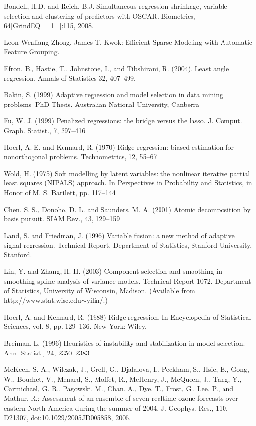\documentclass{article} %
\begin{document}
\noindent [8] Bondell, H.D. and Reich, B.J. Simultaneous regression shrinkage, variable selection and clustering of predictors with OSCAR. Biometrics, 64\eqref{GrindEQ__1_}:115, 2008. \textbf{}

\noindent [9] Leon Wenliang Zhong, James T. Kwok: Efficient Sparse Modeling with Automatic Feature Grouping.

\noindent [10] Efron, B., Hastie, T., Johnstone, I., and Tibshirani, R. (2004). Least angle regression. Annals of Statistics 32, 407--499.\textbf{}

\noindent [11] Bakin, S. (1999) Adaptive regression and model selection in data mining problems. PhD Thesis. Australian National University, Canberra

\noindent [12] Fu, W. J. (1999) Penalized regressions: the bridge versus the lasso. J. Comput. Graph. Statist., 7, 397--416

\noindent [13] Hoerl, A. E. and Kennard, R. (1970) Ridge regression: biased estimation for nonorthogonal problems. Technometrics, 12, 55--67

\noindent [14] Wold, H. (1975) Soft modelling by latent variables: the nonlinear iterative partial least squares (NIPALS) approach. In Perspectives in Probability and Statistics, in Honor of M. S. Bartlett, pp. 117--144

\noindent [15] Chen, S. S., Donoho, D. L. and Saunders, M. A. (2001) Atomic decomposition by basis pursuit. SIAM Rev., 43, 129--159

\noindent [16] Land, S. and Friedman, J. (1996) Variable fusion: a new method of adaptive signal regression. Technical Report. Department of Statistics, Stanford University, Stanford.

\noindent [17] Lin, Y. and Zhang, H. H. (2003) Component selection and smoothing in smoothing spline analysis of variance models. Technical Report 1072. Department of Statistics, University of Wisconsin, Madison. (Available from http://www.stat.wisc.edu$\mathrm{\sim }$yilin/.)

\noindent [18] Hoerl, A. and Kennard, R. (1988) Ridge regression. In Encyclopedia of Statistical Sciences, vol. 8, pp. 129--136. New York: Wiley.

\noindent [19] Breiman, L. (1996) Heuristics of instability and stabilization in model selection. Ann. Statist., 24, 2350--2383.

\noindent [20] McKeen, S. A., Wilczak, J., Grell, G., Djalalova, I., Peckham, S., Hsie, E., Gong, W., Bouchet, V., Menard, S., Moffet, R., McHenry, J., McQueen, J., Tang, Y., Carmichael, G. R., Pagowski, M., Chan, A., Dye, T., Frost, G., Lee, P., and Mathur, R.: Assessment of an ensemble of seven realtime ozone forecasts over eastern North America during the summer of 2004, J. Geophys. Res., 110, D21307, doi:10.1029/2005JD005858, 2005.
\end{document}
